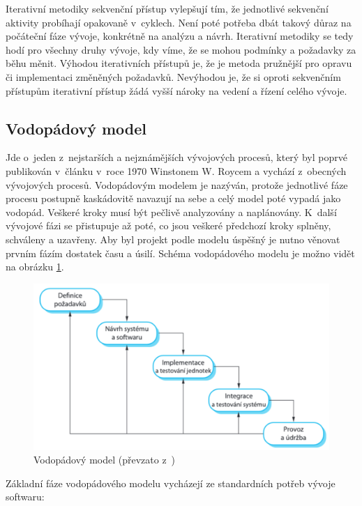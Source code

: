 \documentclass[czech,master]{diploma}
\begin{document}
Iterativní metodiky sekvenční přístup vylepšují tím, že jednotlivé sekvenční aktivity probíhají opakovaně v~cyklech. Není poté potřeba dbát takový důraz na počáteční fáze vývoje, konkrétně na analýzu a návrh. Iterativní metodiky se tedy hodí pro všechny druhy vývoje, kdy víme, že se mohou podmínky a požadavky za běhu měnit. Výhodou iterativních přístupů je, že je metoda pružnější pro opravu či implementaci změněných požadavků. Nevýhodou je, že si oproti sekvenčním přístupům iterativní přístup žádá vyšší nároky na vedení a řízení celého vývoje.

\subsection{Vodopádový model}
Jde o~jeden z~nejstarších a nejznámějších vývojových procesů, který byl poprvé publikován v~článku v~roce 1970 Winstonem W. Roycem a vychází z~obecných vývojových procesů. Vodopádovým modelem je nazýván, protože jednotlivé fáze procesu postupně kaskádovitě navazují na sebe a celý model poté vypadá jako vodopád. Veškeré kroky musí být pečlivě analyzovány a naplánovány. K~další vývojové fázi se přistupuje až poté, co jsou veškeré předchozí kroky splněny, schváleny a uzavřeny. \cite{ref:sommerrville_waterfall} Aby byl projekt podle modelu úspěšný je nutno věnovat prvním fázím dostatek času a úsilí. Schéma vodopádového modelu je možno vidět na obrázku \ref{fig:waterfall}.

\begin{figure}[!ht]
    \centering
    \includegraphics[width=1\textwidth]{Diplomka/Figures/waterfall.png}
    \caption{Vodopádový model (převzato z~\cite{ref:sommerrville_waterfall})}
    \label{fig:waterfall}
\end{figure}

Základní fáze vodopádového modelu vycházejí ze standardních potřeb vývoje softwaru:
\end{document}

